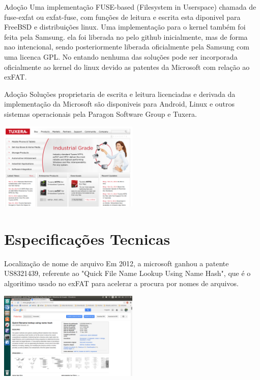 \documentclass[11pt]{beamer}
\begin{document}
\begin{frame}{Adoção}
Uma implementação FUSE-based (Filesystem in Userspace) chamada de fuse-exfat ou exfat-fuse, com funções de leitura e escrita esta diponivel para FreeBSD e distribuições linux. Uma implementação para o kernel também foi feita pela Samsung. ela foi liberada no pelo github inicialmente, mas de forma nao intencional, sendo posteriormente liberada oficialmente pela Samsung com uma licenca GPL. No entando nenhuma das soluções  pode ser incorporada oficialmente ao kernel do linux devido as patentes da Microsoft com relação ao exFAT.
\end{frame}

\begin{frame}{Adoção}
Soluções proprietaria de escrita e leitura licenciadas e derivada da implementação da Microsoft são disponiveis para Android, Linux e outros sistemas operacionais pela Paragon Software Group e Tuxera.
\begin{center}
 \includegraphics[width=0.5\textwidth]{tuxerasite.png} 
\end{center}
\end{frame}

\section{Especificações Tecnicas}

\begin{frame}{Localização de nome de arquivo}
Em 2012, a microsoft ganhou a patente US8321439, referente ao "Quick File Name Lookup Using Name Hash", que é o algoritimo usado no exFAT para acelerar a procura por nomes de arquivos.
\begin{center}
 \includegraphics[width=0.5\textwidth]{quicksearch.png} 
\end{center}
\end{frame}
\end{document}
